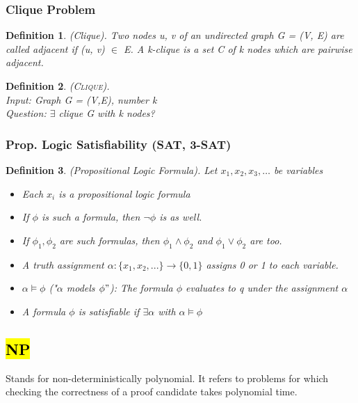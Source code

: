 \documentclass[a3paper, 8pt]{extarticle}
\newtheorem*{definition}{Definition}
\begin{document}
\begin{multicols*}{6}
\subsubsection{Clique Problem}

\begin{definition}
    (Clique). Two nodes u, v of an undirected graph G = (V, E) are called adjacent if (u, v) $\in$ E. A k-clique is a set C of k nodes which are pairwise adjacent.
\end{definition}

\begin{definition}
    \textsc{(Clique)}. \\
    Input: Graph G = (V,E), number k\\
    Question: $\exists$ clique G with k nodes?
\end{definition}

\subsubsection{Prop. Logic Satisfiability (SAT, 3-SAT)}

\begin{definition}
    (Propositional Logic Formula). Let $x_1, x_2, x_3, \dots$ be variables \begin{itemize}
        \item Each $x_i$ is a propositional logic formula
        \item If $\phi$ is such a formula, then $\lnot \phi$ is as well.
        \item If $\phi_1, \phi_2$ are such formulas, then $\phi_1 \land \phi_2$ and $\phi_1 \lor \phi_2$ are too.
        \item A truth assignment $\alpha: \{x_1, x_2, ...\} \to \{0,1\}$ assigns 0 or 1 to each variable.
        \item $\alpha \models \phi$ ("$\alpha$ models $\phi"$): The formula $\phi$ evaluates to q under the assignment $\alpha$
        \item A formula $\phi$ is satisfiable if $\exists \alpha$ with $\alpha \models \phi$
    \end{itemize}
\end{definition}

\subsection{\hl{NP}}
Stands for non-deterministically polynomial. It refers to problems for which checking the correctness of a proof candidate takes polynomial time. 


\end{multicols*}
\end{document}

